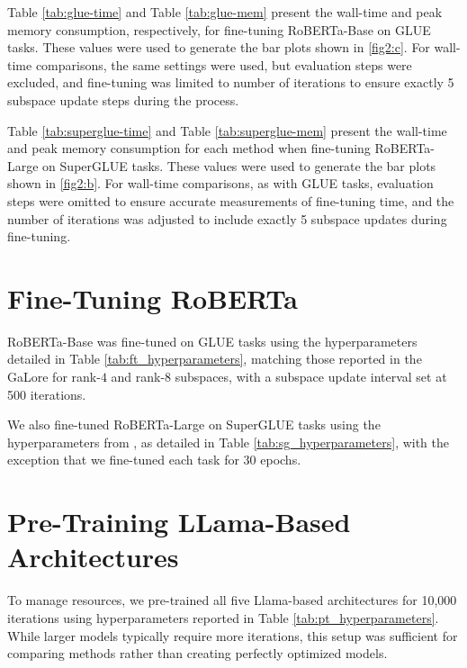 Table \ref{tab:glue-time} and Table \ref{tab:glue-mem} present the wall-time and peak memory consumption, respectively, for fine-tuning RoBERTa-Base on GLUE tasks. These values were used to generate the bar plots shown in \ref{fig2:c}. For wall-time comparisons, the same settings were used, but evaluation steps were excluded, and fine-tuning was limited to number of iterations to ensure exactly 5 subspace update steps during the process.



Table \ref{tab:superglue-time} and Table \ref{tab:superglue-mem} present the wall-time and peak memory consumption for each method when fine-tuning RoBERTa-Large on SuperGLUE tasks. These values were used to generate the bar plots shown in \ref{fig2:b}. For wall-time comparisons, as with GLUE tasks, evaluation steps were omitted to ensure accurate measurements of fine-tuning time, and the number of iterations was adjusted to include exactly 5 subspace updates during fine-tuning.



\section{Fine-Tuning RoBERTa}
\label{appendix:A}
RoBERTa-Base was fine-tuned on GLUE tasks using the hyperparameters detailed in Table \ref{tab:ft_hyperparameters}, matching those reported in the GaLore \citep{zhao2024galorememoryefficientllmtraining} for rank-\(4\) and rank-\(8\) subspaces, with a subspace update interval set at 500 iterations.


We also fine-tuned RoBERTa-Large on SuperGLUE tasks using the hyperparameters from \citet{luo2024badammemoryefficientparameter}, as detailed in Table \ref{tab:sg_hyperparameters}, with the exception that we fine-tuned each task for 30 epochs.


\section{Pre-Training LLama-Based Architectures}
\label{appendix:B}
To manage resources, we pre-trained all five Llama-based architectures for 10,000 iterations using hyperparameters reported in Table \ref{tab:pt_hyperparameters}. While larger models typically require more iterations, this setup was sufficient for comparing methods rather than creating perfectly optimized models. 


